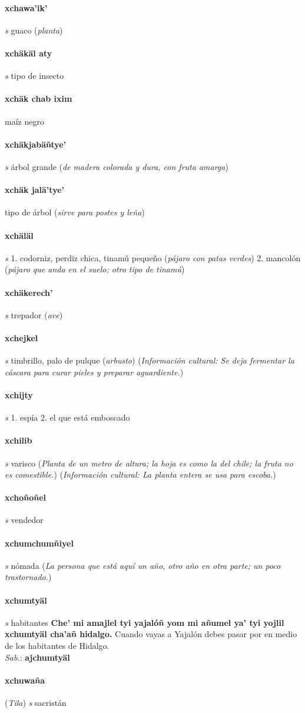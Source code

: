 \documentclass{scrbook}
\newcommand{\entry}[1]{\paragraph{#1}}
\newcommand{\onedefinition}[1]{#1.}
\newcommand{\partofspeech}[1]{\textit{#1}}
\newcommand{\spanishtranslation}[1]{#1}
\newcommand{\clarification}[1]{(\textit{#1})}
\newcommand{\cholexample}[1]{\textbf{#1}}
\newcommand{\exampletranslation}[1]{#1}
\newcommand{\dialectvariant}[1]{\\\textit{#1}:}
\newcommand{\dialectword}[1]{\textbf{#1}}
\newcommand{\relevantdialect}[1]{(\textit{#1})}
\newcommand{\culturalinformation}[1]{(\textit{#1})}
\begin{document}
\begin{multicols}{2}
\entry{xchawa'ik'}
\partofspeech{s}
\spanishtranslation{guaco}
\clarification{planta}

\entry{xchäkäl aty}
\partofspeech{s}
\spanishtranslation{tipo de insecto}

\entry{xchäk chab ixim}
\spanishtranslation{maíz negro}

\entry{xchäkjabäñtye'}
\partofspeech{s}
\spanishtranslation{árbol grande}
\clarification{de madera colorada y dura, con fruta amarga}

\entry{xchäk jalä'tye'}
\spanishtranslation{tipo de árbol}
\clarification{sirve para postes y leña}

\entry{xchäläl}
\partofspeech{s}
\onedefinition{1}
\spanishtranslation{codorniz, perdiz chica, tinamú pequeño}
\clarification{pájaro con patas verdes}
\onedefinition{2}
\spanishtranslation{mancolón}
\clarification{pájaro que anda en el suelo; otro tipo de tinamú}

\entry{xchäkerech'}
\partofspeech{s}
\spanishtranslation{trepador}
\clarification{ave}

\entry{xchejkel}
\partofspeech{s}
\spanishtranslation{timbrillo, palo de pulque}
\clarification{arbusto}
\culturalinformation{Información cultural: Se deja fermentar la cáscara para curar pieles y preparar aguardiente.}

\entry{xchijty}
\partofspeech{s}
\onedefinition{1}
\spanishtranslation{espía}
\onedefinition{2}
\spanishtranslation{el que está emboscado}

\entry{xchilib}
\partofspeech{s}
\spanishtranslation{varisco}
\clarification{Planta de un metro de altura; la hoja es como la del chile; la fruta no es comestible.}
\culturalinformation{Información cultural: La planta entera se usa para escoba.}

\entry{xchoñoñel}
\partofspeech{s}
\spanishtranslation{vendedor}

\entry{xchumchumñiyel}
\partofspeech{s}
\spanishtranslation{nómada}
\clarification{La persona que está aquí un año, otro año en otra parte; un poco trastornado.}

\entry{xchumtyäl}
\partofspeech{s}
\spanishtranslation{habitantes}
\cholexample{Che' mi amajlel tyi yajalóñ yom mi añumel ya' tyi yojlil xchumtyäl cha'añ hidalgo.}
\exampletranslation{Cuando vayas a Yajalón debes pasar por en medio de los habitantes de Hidalgo.}
\dialectvariant{Sab.}
\dialectword{ajchumtyäl}

\entry{xchuwaña}
\relevantdialect{Tila}
\partofspeech{s}
\spanishtranslation{sacristán}


\end{multicols}
\end{document}
